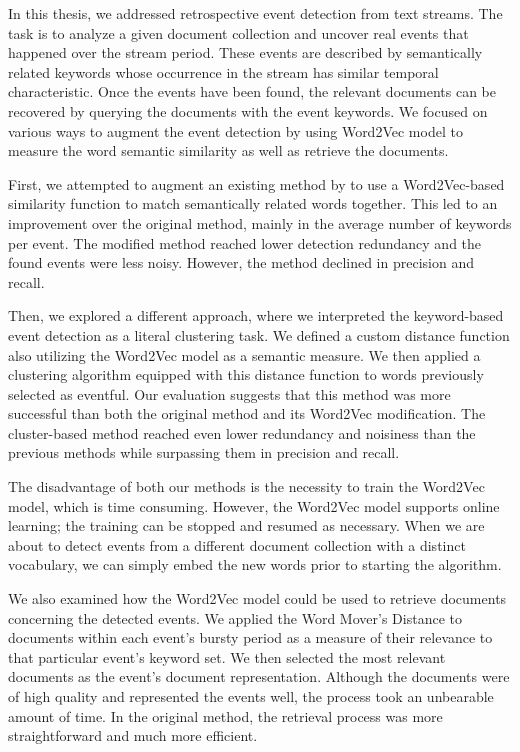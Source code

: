 In this thesis, we addressed retrospective event detection from text streams. The task is to analyze a given document collection and uncover real events that happened over the stream period. These events are described by semantically related keywords whose occurrence in the stream has similar temporal characteristic. Once the events have been found, the relevant documents can be recovered by querying the documents with the event keywords. We focused on various ways to augment the event detection by using Word2Vec model \citep{word2vec} to measure the word semantic similarity as well as retrieve the documents.

First, we attempted to augment an existing method by \cite{event-detection} to use a Word2Vec-based similarity function to match semantically related words together. This led to an improvement over the original method, mainly in the average number of keywords per event. The modified method reached lower detection redundancy and the found events were less noisy. However, the method declined in precision and recall.

Then, we explored a different approach, where we interpreted the keyword-based event detection as a literal clustering task. We defined a custom distance function also utilizing the Word2Vec model as a semantic measure. We then applied a clustering algorithm equipped with this distance function to words previously selected as eventful. Our evaluation suggests that this method was more successful than both the original method and its Word2Vec modification. The cluster-based method reached even lower redundancy and noisiness than the previous methods while surpassing them in precision and recall.

The disadvantage of both our methods is the necessity to train the Word2Vec model, which is time consuming. However, the Word2Vec  model supports online learning; the training can be stopped and resumed as necessary. When we are about to detect events from a different document collection with a distinct vocabulary, we can simply embed the new words prior to starting the algorithm.

We also examined how the Word2Vec model could be used to retrieve documents concerning the detected events. We applied the Word Mover's Distance \citep{wmd} to documents within each event's bursty period as a measure of their relevance to that particular event's keyword set. We then selected the most relevant documents as the event's document representation. Although the documents were of high quality and represented the events well, the process took an unbearable amount of time. In the original method, the retrieval process was more straightforward and much more efficient.


